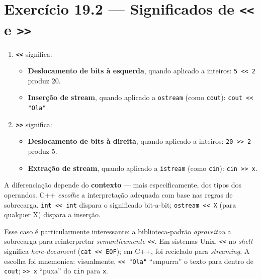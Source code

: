 \documentclass[11pt,a4paper]{article}
\begin{document}
\section{Exerc\'icio 19.2 --- Significados de \texttt{<<} e \texttt{>>}}

\begin{enumerate}[leftmargin=*]
  \item \textbf{\texttt{<<}} significa:
    \begin{itemize}[leftmargin=*,itemsep=0pt]
      \item \textbf{Deslocamento de bits \`a esquerda}, quando aplicado a inteiros: \texttt{5 << 2} produz 20.
      \item \textbf{Inser\c{c}\~ao de stream}, quando aplicado a \texttt{ostream} (como \texttt{cout}): \texttt{cout << "Ola"}.
    \end{itemize}
  \item \textbf{\texttt{>>}} significa:
    \begin{itemize}[leftmargin=*,itemsep=0pt]
      \item \textbf{Deslocamento de bits \`a direita}, quando aplicado a inteiros: \texttt{20 >> 2} produz 5.
      \item \textbf{Extra\c{c}\~ao de stream}, quando aplicado a \texttt{istream} (como \texttt{cin}): \texttt{cin >> x}.
    \end{itemize}
\end{enumerate}

\begin{resposta}
A diferencia\c{c}\~ao depende do \textbf{contexto} --- mais especificamente, dos tipos dos operandos. C++ \emph{escolhe} a interpreta\c{c}\~ao adequada com base nas regras de sobrecarga. \texttt{int << int} dispara o significado bit-a-bit; \texttt{ostream << X} (para qualquer X) dispara a inser\c{c}\~ao.
\end{resposta}

\begin{obseng}
Esse caso \'e particularmente interessante: a biblioteca-padr\~ao \emph{aproveitou} a sobrecarga para reinterpretar \emph{semanticamente} \texttt{<<}. Em sistemas Unix, \texttt{<<} no \emph{shell} significa \emph{here-document} (\texttt{cat << EOF}); em C++, foi reciclado para \emph{streaming}. A escolha foi mnemonica: visualmente, \texttt{<< "Ola"} ``empurra'' o texto para dentro de \texttt{cout}; \texttt{>> x} ``puxa'' do \texttt{cin} para \texttt{x}.
\end{obseng}
\end{document}
